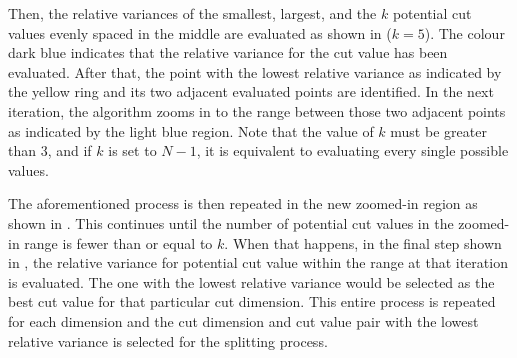 Then, the relative variances of the smallest, largest, and the $k$ potential cut values evenly spaced in the middle are evaluated as shown in  ($k=5$). The colour dark blue indicates that the relative variance for the cut value has been evaluated. After that, the point with the lowest relative variance as indicated by the yellow ring and its two adjacent evaluated points are identified. In the next iteration, the algorithm zooms in to the range between those two adjacent points as indicated by the light blue region. Note that the value of $k$ must be greater than 3, and if $k$ is set to $N-1$, it is equivalent to evaluating every single possible values. 

The aforementioned process is then repeated in the new zoomed-in region as shown in . This continues until the number of potential cut values in the zoomed-in range is fewer than or equal to $k$. When that happens, in the final step shown in , the relative variance for potential cut value within the range at that iteration is evaluated. The one with the lowest relative variance would be selected as the best cut value for that particular cut dimension. 
This entire process is repeated for each dimension and the cut dimension and cut value pair with the lowest relative variance is selected for the splitting process.



